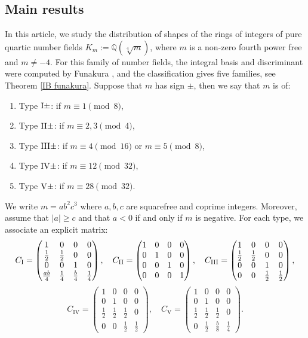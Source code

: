 \documentclass[table]{amsart}
\newcommand{\Q}{\mathbb{Q}}
\numberwithin{equation}{section}
\begin{document}
\subsection{Main results} In this article, we study the distribution of shapes of the rings of integers of pure quartic number fields $K_m:=\Q(\sqrt[4]{m})$, where $m$ is a non-zero fourth power free and $m\neq -4$. For this family of number fields, the integral basis and discriminant were computed by Funakura \cite{Funakura}, and the classification gives five families, see Theorem \ref{IB funakura}. Suppose that $m$ has sign $\pm$, then we say that $m$ is of:
\begin{enumerate}
    \item Type $\rm{I}\pm$: if $m\equiv 1\pmod{8}$, 
    \item Type $\rm{II}\pm$: if $m\equiv 2,3\pmod{4}$,
    \item Type $\rm{III}\pm$: if $m\equiv 4\pmod{16}$ or $m\equiv 5\pmod{8}$,
    \item Type $\rm{IV}\pm$: if $m\equiv 12\pmod{32}$, 
    \item Type $\rm{V}\pm$: if $m\equiv 28\pmod{32}$.
\end{enumerate}
We write $m=ab^2c^3$ where $a,b,c$ are squarefree and coprime integers. Moreover, assume that $|a|\geq c$ and that $a<0$ if and only if $m$ is negative. For each type, we associate an explicit matrix:
\[
C_{\mathrm{I}} = \begin{pmatrix}
1 & 0 & 0 & 0 \\
\frac{1}{2} & \frac{1}{2} & 0 & 0 \\
0 & 0 & 1 & 0 \\
\frac{ab}{4} & \frac{1}{4} & \frac{b}{4} & \frac{1}{4}
\end{pmatrix},\quad C_{\mathrm{II}} = \begin{pmatrix}
1 & 0 & 0 & 0 \\
0& 1 & 0 & 0 \\
0 & 0 & 1 & 0 \\
0 & 0 & 0 & 1
\end{pmatrix}, \\ \quad
C_{\mathrm{III}} = \begin{pmatrix}
1 & 0 & 0 & 0 \\
\frac{1}{2} & \frac{1}{2} & 0 & 0 \\
0 & 0 & 1 & 0 \\
0 & 0 & \frac{1}{2} & \frac{1}{2}
\end{pmatrix}, \]\[
C_{\mathrm{IV}} = \begin{pmatrix}
1 & 0 & 0 & 0 \\
0 & 1 & 0 & 0 \\
\frac{1}{2} & \frac{1}{2} & \frac{1}{2} & 0 \\
0 & 0 & \frac{1}{2} & \frac{1}{2}
\end{pmatrix}, \quad
C_{\mathrm{V}} = \begin{pmatrix}
1 & 0 & 0 & 0 \\
0 & 1 & 0 & 0 \\
\frac{1}{2} & \frac{1}{2} & \frac{1}{2} & 0 \\
0 & \frac{1}{2} & \frac{b}{8} & \frac{1}{4}
\end{pmatrix}.
\]
\end{document}
